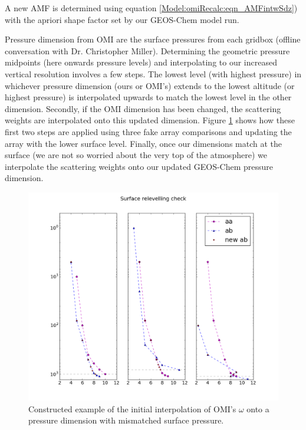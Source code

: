     A new AMF is determined using equation \ref{Model:omiRecalc:eqn_AMFintwSdz}) with the apriori shape factor set by our GEOS-Chem model run.
    
    
    Pressure dimension from OMI are the surface pressures from each gridbox (offline conversation with Dr. Christopher Miller).
    Determining the geometric pressure midpoints (here onwards pressure levels) and interpolating to our increased vertical resolution involves a few steps.
    The lowest level (with highest pressure) in whichever pressure dimension (ours or OMI's) extends to the lowest altitude (or highest pressure) is interpolated upwards to match the lowest level in the other dimension.
    Secondly, if the OMI dimension has been changed, the scattering weights are interpolated onto this updated dimension.
    Figure \ref{ch_HCHO:fig:AMF_Surface_Relevel} shows how these first two steps are applied using three fake array comparisons and updating the array with the lower surface level.
    Finally, once our dimensions match at the surface (we are not so worried about the very top of the atmosphere) we interpolate the scattering weights onto our updated GEOS-Chem pressure dimension.
    
    \begin{figure}[!htbp]
      \includegraphics[width=\textwidth]{Figures/HCHO/SurfaceRelevelCheck.png}
      \caption{Constructed example of the initial interpolation of OMI's $\omega$ onto a pressure dimension with mismatched surface pressure.}
      \label{ch_HCHO:fig:AMF_Surface_Relevel}
      \end{figure}
      
